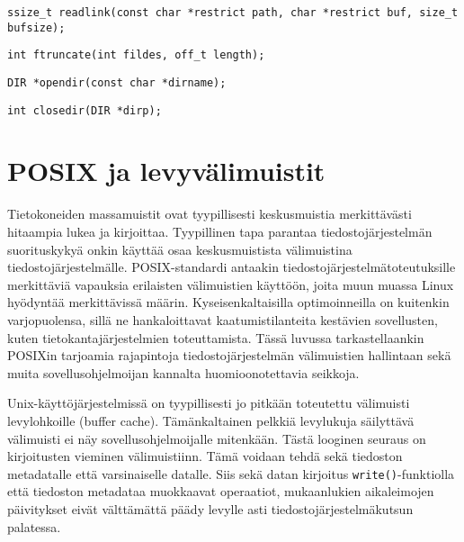 \begin{verbatim}
ssize_t readlink(const char *restrict path, char *restrict buf, size_t bufsize);
\end{verbatim}

\begin{verbatim}
int ftruncate(int fildes, off_t length);
\end{verbatim}

\begin{verbatim}
DIR *opendir(const char *dirname);
\end{verbatim}

\begin{verbatim}
int closedir(DIR *dirp);
\end{verbatim}

\section{POSIX ja levyvälimuistit}
Tietokoneiden massamuistit ovat tyypillisesti keskusmuistia merkittävästi hitaampia lukea ja kirjoittaa.
Tyypillinen tapa parantaa tiedostojärjestelmän suorituskykyä onkin käyttää osaa keskusmuistista välimuistina tiedostojärjestelmälle.
POSIX-standardi antaakin tiedostojärjestelmätoteutuksille merkittäviä vapauksia erilaisten välimuistien käyttöön,
joita muun muassa Linux hyödyntää merkittävissä määrin.
Kyseisenkaltaisilla optimoinneilla on kuitenkin varjopuolensa,
sillä ne hankaloittavat kaatumistilanteita kestävien sovellusten, kuten tietokantajärjestelmien toteuttamista.
Tässä luvussa tarkastellaankin POSIXin tarjoamia rajapintoja tiedostojärjestelmän välimuistien hallintaan sekä muita sovellusohjelmoijan kannalta huomioonotettavia seikkoja.

Unix-käyttöjärjestelmissä on tyypillisesti jo pitkään toteutettu välimuisti levylohkoille (buffer cache).
Tämänkaltainen pelkkiä levylukuja säilyttävä välimuisti ei näy sovellusohjelmoijalle mitenkään.
Tästä looginen seuraus on kirjoitusten vieminen välimuistiinn.
Tämä voidaan tehdä sekä tiedoston metadatalle että varsinaiselle datalle.
Siis sekä datan kirjoitus \texttt{write()}-funktiolla että
tiedoston metadataa muokkaavat operaatiot,
mukaanlukien aikaleimojen päivitykset eivät välttämättä päädy levylle asti tiedostojärjestelmäkutsun palatessa.

